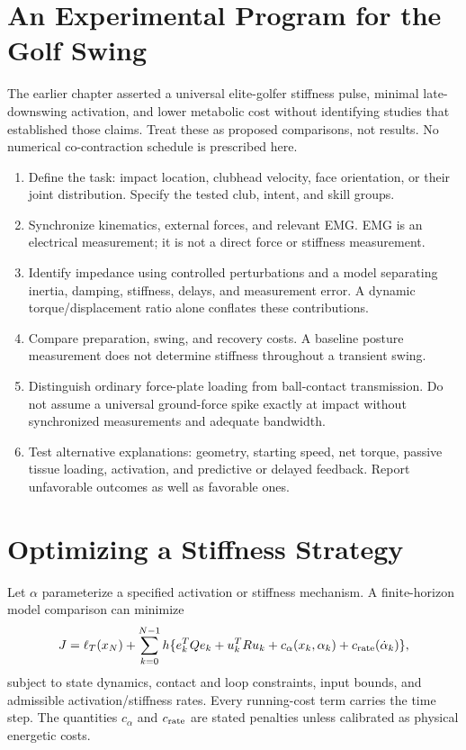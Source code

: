 \section{An Experimental Program for the Golf Swing}

The earlier chapter asserted a universal elite-golfer stiffness pulse, minimal
late-downswing activation, and lower metabolic cost without identifying studies
that established those claims. Treat these as proposed comparisons, not results.
No numerical co-contraction schedule is prescribed here.

\begin{enumerate}
\item Define the task: impact location, clubhead velocity, face orientation,
or their joint distribution. Specify the tested club, intent, and skill groups.
\item Synchronize kinematics, external forces, and relevant EMG. EMG is an
electrical measurement; it is not a direct force or stiffness measurement.
\item Identify impedance using controlled perturbations and a model separating
inertia, damping, stiffness, delays, and measurement error. A dynamic
torque/displacement ratio alone conflates these contributions.
\item Compare preparation, swing, and recovery costs. A baseline posture
measurement does not determine stiffness throughout a transient swing.
\item Distinguish ordinary force-plate loading from ball-contact transmission.
Do not assume a universal ground-force spike exactly at impact without
synchronized measurements and adequate bandwidth.
\item Test alternative explanations: geometry, starting speed, net torque,
passive tissue loading, activation, and predictive or delayed feedback.
Report unfavorable outcomes as well as favorable ones.
\end{enumerate}

\section{Optimizing a Stiffness Strategy}
\label{sec:optimization}

Let $\alpha$ parameterize a specified activation or stiffness mechanism. A
finite-horizon model comparison can minimize
\begin{equation}
J=\ell_T(x_N)+\sum_{k=0}^{N-1}h\{e_k^TQe_k+u_k^TRu_k+
c_\alpha(x_k,\alpha_k)+c_{\rm rate}(\dot\alpha_k)\},
\end{equation}
subject to state dynamics, contact and loop constraints, input bounds, and
admissible activation/stiffness rates. Every running-cost term carries the
time step. The quantities $c_\alpha$ and $c_{\rm rate}$ are stated penalties
unless calibrated as physical energetic costs.

